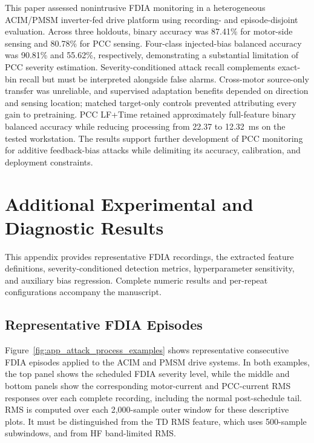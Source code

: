 \documentclass[letterpaper,journal]{IEEEtran}
\begin{document}
This paper assessed nonintrusive FDIA monitoring in a heterogeneous ACIM/PMSM inverter-fed drive platform using recording- and episode-disjoint evaluation. Across three holdouts, binary accuracy was 87.41\% for motor-side sensing and 80.78\% for PCC sensing. Four-class injected-bias balanced accuracy was 90.81\% and 55.62\%, respectively, demonstrating a substantial limitation of PCC severity estimation. Severity-conditioned attack recall complements exact-bin recall but must be interpreted alongside false alarms. Cross-motor source-only transfer was unreliable, and supervised adaptation benefits depended on direction and sensing location; matched target-only controls prevented attributing every gain to pretraining. PCC LF+Time retained approximately full-feature binary balanced accuracy while reducing processing from 22.37 to 12.32~ms on the tested workstation. The results support further development of PCC monitoring for additive feedback-bias attacks while delimiting its accuracy, calibration, and deployment constraints.




\appendices
\section{Additional Experimental and Diagnostic Results}
\label{app:additional_results}


This appendix provides representative FDIA recordings, the extracted feature definitions, severity-conditioned detection metrics, hyperparameter sensitivity, and auxiliary bias regression. Complete numeric results and per-repeat configurations accompany the manuscript.

\subsection{Representative FDIA Episodes}
\label{app:fdia_episode_examples}

Figure~\ref{fig:app_attack_process_examples} shows representative consecutive FDIA episodes applied to the ACIM and PMSM drive systems. In both examples, the top panel shows the scheduled FDIA severity level, while the middle and bottom panels show the corresponding motor-current and PCC-current RMS responses over each complete recording, including the normal post-schedule tail. RMS is computed over each 2,000-sample outer window for these descriptive plots. It must be distinguished from the TD RMS feature, which uses 500-sample subwindows, and from HF band-limited RMS.
\end{document}
